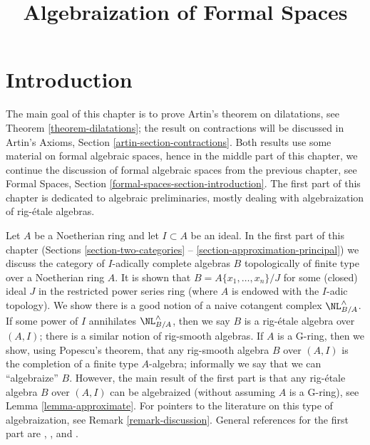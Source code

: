 

%


\title{Algebraization of Formal Spaces}


\maketitle

\label{section-phantom}

\tableofcontents

\section{Introduction}
\label{section-introduction}

\noindent
The main goal of this chapter is to prove Artin's theorem on dilatations,
see Theorem \ref{theorem-dilatations}; the result on contractions will be
discussed in Artin's Axioms, Section \ref{artin-section-contractions}.
Both results use some material on formal algebraic spaces, hence
in the middle part of this chapter, we
continue the discussion of formal algebraic spaces from the previous
chapter, see Formal Spaces, Section \ref{formal-spaces-section-introduction}.
The first part of this chapter is dedicated to algebraic preliminaries,
mostly dealing with algebraization of rig-\'etale algebras.

\medskip\noindent
Let $A$ be a Noetherian ring and let $I \subset A$ be an ideal. In the
first part of this chapter (Sections \ref{section-two-categories}
-- \ref{section-approximation-principal})
we discuss the category of $I$-adically complete algebras $B$
topologically of finite type over a Noetherian ring $A$.
It is shown that $B = A\{x_1, \ldots, x_n\}/J$ for some
(closed) ideal $J$ in the restricted power series ring
(where $A$ is endowed with the $I$-adic topology).
We show there is a good notion of a naive cotangent complex
$\NL_{B/A}^\wedge$. If some power of $I$ annihilates
$\NL_{B/A}^\wedge$, then we say $B$ is a rig-\'etale algebra
over $(A, I)$; there is a similar notion of rig-smooth algebras.
If $A$ is a G-ring, then we show, using Popescu's theorem,
that any rig-smooth algebra $B$ over $(A, I)$ is the completion
of a finite type $A$-algebra; informally we say that we can ``algebraize'' $B$.
However, the main result of the first part is that any rig-\'etale
algebra $B$ over $(A, I)$ can be algebraized (without assuming $A$ is
a G-ring), see Lemma \ref{lemma-approximate}. For pointers to the literature
on this type of algebraization, see Remark \ref{remark-discussion}.
General references for the first part are
\cite{EGA}, \cite{Abbes}, and \cite{Fujiwara-Kato}.

